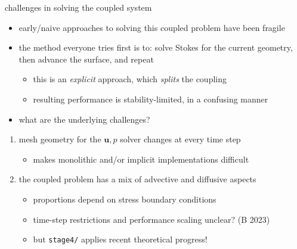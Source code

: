 \documentclass[10pt,
               hyperref={colorlinks,citecolor=DeepPink4,linkcolor=black,urlcolor=blue},
               svgnames]{beamer}
\newcommand{\bu}{\mathbf{u}}
\begin{document}
\begin{frame}{challenges in solving the coupled system}

\begin{itemize}
\item early/naive approaches to solving this coupled problem have been fragile
\item the method everyone tries first is to: solve Stokes for the current geometry, then advance the surface, and repeat
    \begin{itemize}
    \item[$\circ$] this is an \emph{explicit} approach, which \emph{splits} the coupling
    \item[$\circ$] resulting performance is \alert{stability-limited}, in a confusing manner
    \end{itemize}

\medskip
\item<2> what are the underlying challenges?
\end{itemize}

\begin{enumerate}
\item<2> mesh geometry for the $\bu,p$ solver changes at every time step
    \begin{itemize}
    \item[$\circ$] makes monolithic and/or implicit implementations difficult
    \end{itemize}
\item<2> the coupled problem \alert{has a mix of advective and diffusive aspects}
    \begin{itemize}
    \item[$\circ$] proportions depend on stress boundary conditions
    \item[$\circ$] time-step restrictions and performance scaling unclear? (B 2023)
    \item[$\circ$] but \texttt{stage4/} applies recent theoretical progress!
    \end{itemize}
\end{enumerate}
\end{frame}
\end{document}
